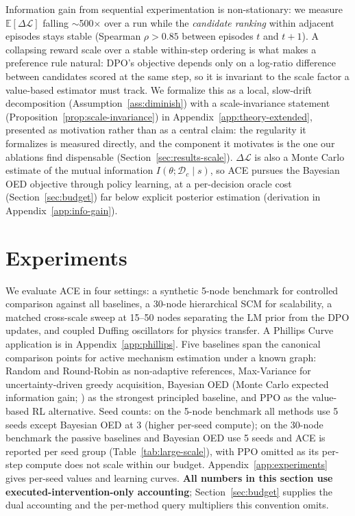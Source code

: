 \documentclass[twoside]{article}
\theoremstyle{plain}
\theoremstyle{definition}
\theoremstyle{remark}
\begin{document}
Information gain from sequential experimentation is non-stationary: we measure $\mathbb{E}[\Delta\mathcal{L}]$ falling $\sim$500$\times$ over a run while the \emph{candidate ranking} within adjacent episodes stays stable (Spearman $\rho>0.85$ between episodes $t$ and $t+1$). A collapsing reward scale over a stable within-step ordering is what makes a preference rule natural: DPO's objective depends only on a log-ratio difference between candidates scored at the same step, so it is invariant to the scale factor a value-based estimator must track. We formalize this as a local, slow-drift decomposition (Assumption~\ref{ass:diminish}) with a scale-invariance statement (Proposition~\ref{prop:scale-invariance}) in Appendix~\ref{app:theory-extended}, presented as motivation rather than as a central claim: the regularity it formalizes is measured directly, and the component it motivates is the one our ablations find dispensable (Section~\ref{sec:results-scale}). $\Delta\mathcal{L}$ is also a Monte Carlo estimate of the mutual information $I(\theta;\mathcal{D}_c\mid s)$, so ACE pursues the Bayesian OED objective \citep{toth2022active} through policy learning, at a per-decision oracle cost (Section~\ref{sec:budget}) far below explicit posterior estimation (derivation in Appendix~\ref{app:info-gain}).

\section{Experiments}
\label{sec:results}

We evaluate ACE in four settings: a synthetic 5-node benchmark for controlled comparison against all baselines, a 30-node hierarchical SCM for scalability, a matched cross-scale sweep at 15--50 nodes separating the LM prior from the DPO updates, and coupled Duffing oscillators for physics transfer. A Phillips Curve application is in Appendix~\ref{app:phillips}. Five baselines span the canonical comparison points for active mechanism estimation under a known graph: Random and Round-Robin \citep{fisher1935design} as non-adaptive references, Max-Variance \citep{cohn1996active,gal2016dropout} for uncertainty-driven greedy acquisition, Bayesian OED (Monte Carlo expected information gain; \citealp{toth2022active,tigas2022interventions,zhou2024sample}) as the strongest principled baseline, and PPO \citep{schulman2017proximal} as the value-based RL alternative. Seed counts: on the 5-node benchmark all methods use 5 seeds except Bayesian OED at 3 (higher per-seed compute); on the 30-node benchmark the passive baselines and Bayesian OED use 5 seeds and ACE is reported per seed group (Table~\ref{tab:large-scale}), with PPO omitted as its per-step compute does not scale within our budget. Appendix~\ref{app:experiments} gives per-seed values and learning curves. \textbf{All numbers in this section use executed-intervention-only accounting}; Section~\ref{sec:budget} supplies the dual accounting and the per-method query multipliers this convention omits.
\end{document}
